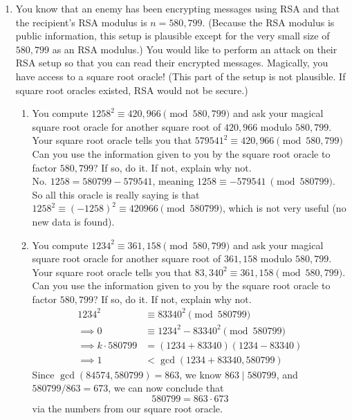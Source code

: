 \documentclass[12pt]{article}
\newcommand{\n}{\vspace{0.25cm}}
\begin{document}
\begin{enumerate}
\item You know that an enemy has been encrypting messages using RSA and that the recipient's RSA modulus is $n = 580,799$.  (Because the RSA modulus is public information, this setup is plausible except for the very small size of $580,799$ as an RSA modulus.)  You would like to perform an attack on their RSA setup so that you can read their encrypted messages.  Magically, you have access to a square root oracle!  (This part of the setup is not plausible.  If square root oracles existed, RSA would not be secure.)  
\begin{enumerate}
\item You compute $1258^2 \equiv 420,966 \pmod{580,799}$ and ask your magical square root oracle for another square root of $420,966$ modulo $580,799$.  Your square root oracle tells you that $579541^2 \equiv 420,966 \pmod{580,799}$  Can you use the information given to you by the square root oracle to factor $580,799$?  If so, do it.  If not, explain why not. \n\\
  No.  \(1258 = 580799 - 579541\), meaning \(1258 \equiv -579541\ \pmod{580799}\).  So all this oracle is really saying is that \(1258^2 \equiv (-1258)^2 \equiv 420966 \pmod {580799}\), which is not very useful (no new data is found). \n

\item You compute $1234^2\equiv 361,158 \pmod{580,799}$ and ask your magical square root oracle for another square root of $361,158 $ modulo $580,799$. Your square root oracle tells you that $83,340^2\equiv 361,158 \pmod{580,799}$.  Can you use the information given to you by the square root oracle to factor $580,799$?  If so, do it.  If not, explain why not.
  \begin{align*}
    1234^2 &\equiv 83340^2 \pmod{580799} \\
    \implies 0 &\equiv 1234^2 - 83340^2 \pmod{580799} \\
    \implies k \cdot 580799 &= (1234 + 83340)(1234 - 83340) \\
    \implies 1 &< \gcd(1234+83340, 580799)
  \end{align*}
  Since \(\gcd(84574, 580799) = 863\), we know \(863 \mid 580799\), and \(580799 / 863 = 673\), we can now conclude that \[580799 = 863 \cdot 673\]
  via the numbers from our square root oracle.
\end{enumerate}
\end{enumerate}
\end{document}
